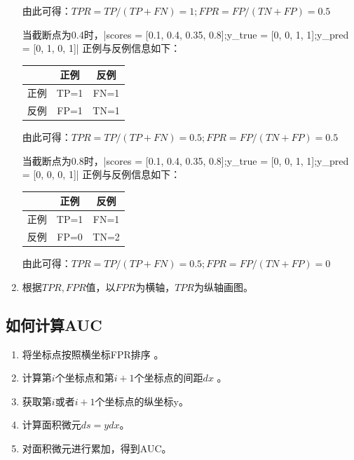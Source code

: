 \begin{enumerate}
		由此可得：$TPR = TP/(TP+FN) = 1; FPR = FP/(TN+FP) = 0.5$

		当截断点为0.4时，\li|scores = [0.1, 0.4, 0.35, 0.8];y_true = [0, 0, 1, 1];y_pred = [0, 1, 0, 1]| 正例与反例信息如下：

			\begin{table}[h]
				\centering
				\begin{tabular}{|c|c|c|}\hline
					& 正例 & 反例 \\\hline
					正例  & TP=1 & FN=1\\\hline 
					反例  & FP=1 & TN=1\\\hline 
				\end{tabular}
			\end{table}

		由此可得：$TPR = TP/(TP+FN) = 0.5; FPR = FP/(TN+FP) = 0.5$

		当截断点为0.8时，\li|scores = [0.1, 0.4, 0.35, 0.8];y_true = [0, 0, 1, 1];y_pred = [0, 0, 0, 1]| 正例与反例信息如下：

			\begin{table}[h]
				\centering
				\begin{tabular}{|c|c|c|}\hline
					& 正例 & 反例 \\\hline
					正例  & TP=1 & FN=1\\\hline 
					反例  & FP=0 & TN=2\\\hline 
				\end{tabular}
			\end{table}

由此可得：$TPR = TP/(TP+FN) = 0.5; FPR = FP/(TN+FP) = 0$

\item 根据$TPR,FPR$值，以$FPR$为横轴，$TPR$为纵轴画图。
\end{enumerate}

\subsection{如何计算AUC}

\begin{enumerate}\itemsep0em 
		\item 将坐标点按照横坐标FPR排序 。
		\item 计算第$i$个坐标点和第$i+1$个坐标点的间距$dx$ 。 
		\item 获取第$i$或者$i+1$个坐标点的纵坐标y。
		\item 计算面积微元$ds=ydx$。
		\item 对面积微元进行累加，得到AUC。
\end{enumerate}



